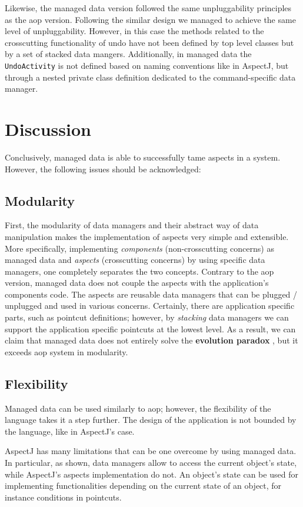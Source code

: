 Likewise, the managed data version followed the same unpluggability principles as the \ac{aop} version.
Following the similar design we managed to achieve the same level of unpluggability.
However, in this case the methods related to the crosscutting functionality of undo have not been defined by top level classes but by a set of stacked data mangers.
Additionally, in managed data the \texttt{UndoActivity} is not defined based on naming conventions like in AspectJ, but through a nested private class definition dedicated to the command-specific data manager.

\section{Discussion}\label{Evaluation Discussion}
Conclusively, managed data is able to successfully tame aspects in a system.
However, the following issues should be acknowledged:

\subsection{Modularity}
First, the modularity of data managers and their abstract way of data manipulation makes the implementation of aspects very simple and extensible.
More specifically, implementing \textit{components} (non-crosscutting concerns) as managed data and \textit{aspects} (crosscutting concerns) by using specific data managers, one completely separates the two concepts.
Contrary to the \ac{aop} version, managed data does not couple the aspects with the application's components code.
The aspects are reusable data managers that can be plugged / unplugged and used in various concerns.
Certainly, there are application specific parts, such as pointcut definitions; however, by \textit{stacking} data managers we can support the application specific pointcuts at the lowest level.
As a result, we can claim that managed data does not entirely solve the \textbf{evolution paradox} \cite{tourwe2003existence}, but it exceeds \ac{aop} system in modularity.

\subsection{Flexibility}
Managed data can be used similarly to \ac{aop}; however, the flexibility of the language takes it a step further.
The design of the application is not bounded by the language, like in AspectJ's case.

AspectJ has many limitations that can be one overcome by using managed data.
In particular, as shown, data managers allow to access the current object's state, while AspectJ's aspects implementation do not.
An object's state can be used for implementing functionalities depending on the current state of an object, for instance conditions in pointcuts.

